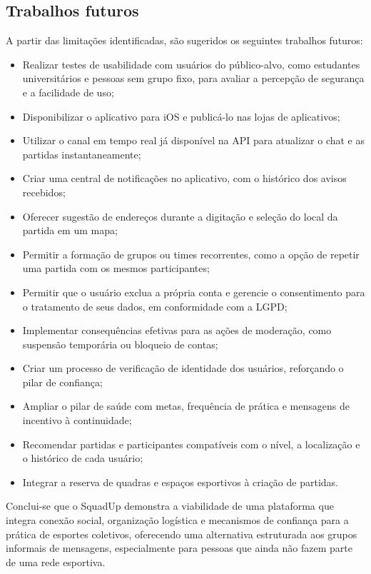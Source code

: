 \documentclass[a4paper, 12pt]{article}
\begin{document}
\begin{justify}
\subsection{Trabalhos futuros}

A partir das limitações identificadas, são sugeridos os seguintes trabalhos futuros:

\begin{itemize}
    \item Realizar testes de usabilidade com usuários do público-alvo, como estudantes universitários e pessoas sem grupo fixo, para avaliar a percepção de segurança e a facilidade de uso;
    \item Disponibilizar o aplicativo para iOS e publicá-lo nas lojas de aplicativos;
    \item Utilizar o canal em tempo real já disponível na API para atualizar o chat e as partidas instantaneamente;
    \item Criar uma central de notificações no aplicativo, com o histórico dos avisos recebidos;
    \item Oferecer sugestão de endereços durante a digitação e seleção do local da partida em um mapa;
    \item Permitir a formação de grupos ou times recorrentes, como a opção de repetir uma partida com os mesmos participantes;
    \item Permitir que o usuário exclua a própria conta e gerencie o consentimento para o tratamento de seus dados, em conformidade com a LGPD;
    \item Implementar consequências efetivas para as ações de moderação, como suspensão temporária ou bloqueio de contas;
    \item Criar um processo de verificação de identidade dos usuários, reforçando o pilar de confiança;
    \item Ampliar o pilar de saúde com metas, frequência de prática e mensagens de incentivo à continuidade;
    \item Recomendar partidas e participantes compatíveis com o nível, a localização e o histórico de cada usuário;
    \item Integrar a reserva de quadras e espaços esportivos à criação de partidas.
\end{itemize}

Conclui-se que o SquadUp demonstra a viabilidade de uma plataforma que integra conexão social, organização logística e mecanismos de confiança para a prática de esportes coletivos, oferecendo uma alternativa estruturada aos grupos informais de mensagens, especialmente para pessoas que ainda não fazem parte de uma rede esportiva.

\end{justify}

\clearpage


\end{document}

